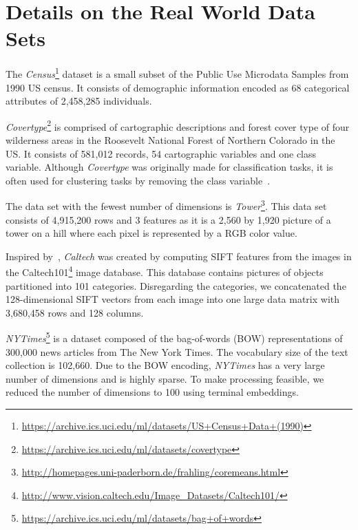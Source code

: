 \section{Details on the Real World Data Sets}

The \textit{Census}\footnote{\url{https://archive.ics.uci.edu/ml/datasets/US+Census+Data+(1990)}} dataset is a small subset of the Public Use Microdata Samples from 1990 US census. It consists of demographic information encoded as 68 categorical attributes of 2,458,285 individuals. 

\textit{Covertype}\footnote{\url{https://archive.ics.uci.edu/ml/datasets/covertype}} is comprised of cartographic descriptions and forest cover type of four wilderness areas in the Roosevelt National Forest of Northern Colorado in the US. It consists of 581,012 records, 54 cartographic variables and one class variable. Although \textit{Covertype} was originally made for classification tasks, it is often used for clustering tasks by removing the class variable~\cite{AckermannMRSLS12}.

The data set with the fewest number of dimensions is \textit{Tower}\footnote{\url{http://homepages.uni-paderborn.de/frahling/coremeans.html}}. This data set consists of 4,915,200 rows and 3 features as it is a 2,560 by 1,920 picture of a tower on a hill where each pixel is represented by a RGB color value. 



Inspired by~\cite{FGSSS13}, \textit{Caltech} was created by computing SIFT features from the images in the Caltech101\footnote{\url{http://www.vision.caltech.edu/Image_Datasets/Caltech101/}} image database. This database contains pictures of objects partitioned into 101 categories. Disregarding the categories, we concatenated the 128-dimensional SIFT vectors from each image into one large data matrix with 3,680,458 rows and 128 columns. 

\textit{NYTimes}\footnote{\url{https://archive.ics.uci.edu/ml/datasets/bag+of+words}} is a dataset composed of the bag-of-words (BOW) representations of 300,000 news articles from The New York Times. The vocabulary size of the text collection is 102,660. Due to the BOW encoding, \textit{NYTimes} has a very large number of dimensions and is highly sparse. To make processing feasible, we reduced the number of dimensions to 100 using terminal embeddings.





